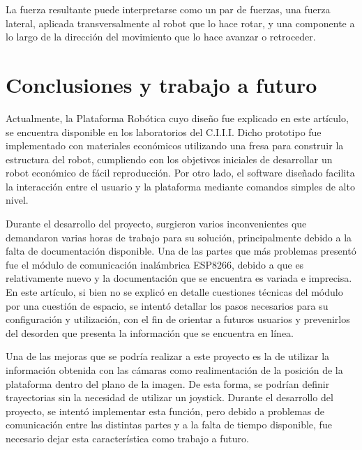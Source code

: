 \documentclass[conference,a4paper,9pt]{IEEEtran}
\begin{document}
La fuerza resultante puede interpretarse como un par de fuerzas, una fuerza lateral, aplicada transversalmente al robot que lo hace rotar, y una componente a lo largo de la dirección del movimiento que lo hace avanzar o retroceder.

\section{Conclusiones y trabajo a futuro}

Actualmente, la Plataforma Robótica cuyo diseño fue explicado en este artículo, se encuentra disponible en los laboratorios del C.I.I.I. Dicho prototipo fue implementado con materiales económicos utilizando una fresa para construir la estructura del robot, cumpliendo con los objetivos iniciales de desarrollar un robot económico de fácil reproducción. Por otro lado, el software diseñado facilita la interacción entre el usuario y la plataforma mediante comandos simples de alto nivel.

Durante el desarrollo del proyecto, surgieron varios inconvenientes que demandaron varias horas de trabajo para su solución, principalmente debido a la falta de documentación disponible. Una de las partes que más problemas presentó fue el módulo de comunicación inalámbrica ESP8266, debido a que es relativamente nuevo y la documentación que se encuentra es variada e imprecisa. En este artículo, si bien no se explicó en detalle cuestiones técnicas del módulo por una cuestión de espacio, se intentó detallar los pasos necesarios para su configuración y utilización, con el fin de orientar a futuros usuarios y prevenirlos del desorden que presenta la información que se encuentra en línea.

Una de las mejoras que se podría realizar a este proyecto es la de utilizar la información obtenida con las cámaras como realimentación de la posición de la plataforma dentro del plano de la imagen. De esta forma, se podrían definir trayectorias sin la necesidad de utilizar un joystick. Durante el desarrollo del proyecto, se intentó implementar esta función, pero debido a problemas de comunicación entre las distintas partes y a la falta de tiempo disponible, fue necesario dejar esta característica como trabajo a futuro.
\end{document}

